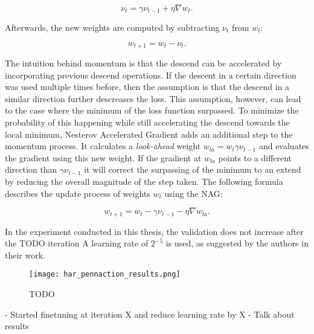 \begin{equation}
    \nu_t = \gamma \nu_{t-1} + \eta \nabla w_t.
\end{equation}

Afterwards, the new weights are computed by subtracting $\nu_t$ from $w_t$:

\begin{equation}
    w_{t+1} = w_t - \nu_t.
\end{equation}

The intuition behind momentum is that the descend can be accelerated by incorporating previous descend operations.
If the descent in a certain direction was used multiple times before, then the assumption is that the descend in a similar direction further descreases the loss.
This assumption, however, can lead to the case where the minimum of the loss function surpassed.
To minimize the probability of this happening while still accelerating the descend towards the local minimum, Nesterov Accelerated Gradient adds an additional step to the momentum process.
It calculates a \textit{look-ahead} weight $w_{la} = w_{t} \gamma \nu_{t-1}$ and evaluates the gradient using this new weight.
If the gradient at $w_{la}$ points to a different direction than $\gamma \nu_{t-1}$ it will correct the surpassing of the minimum to an extend by reducing the overall magnitude of the step taken.
The following formula describes the update process of weights $w_t$ using the NAG:

\begin{equation}
    w_{t+1} = w_t - \gamma \nu_{t-1} - \eta \nabla w_{la}.
\end{equation}

In the experiment conducted in this thesis, the validation does not increase after the TODO iteration
A learning rate of $2^{-5}$ is used, as suggested by the authors in their work.

\begin{figure}[htb!]
    \centering
    \texttt{[image: har\_pennaction\_results.png]}
    \caption{TODO}
    \label{fig:har_pennaction_results}
\end{figure}

- Started finetuning at iteration X and reduce learning rate by X %
- Talk about results

